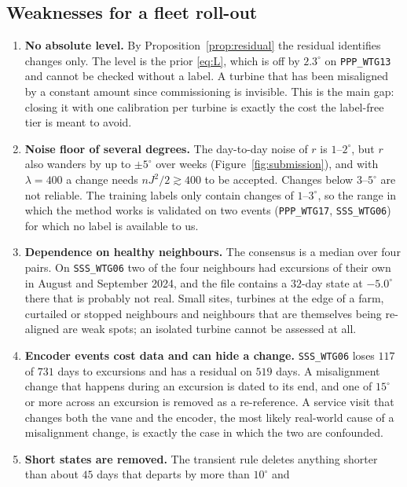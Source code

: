 \documentclass[11pt,a4paper]{article}
\theoremstyle{remark}
\newcommand{\dg}{^{\circ}}
\newcommand{\code}[1]{\texttt{#1}}
\begin{document}
\subsection{Weaknesses for a fleet roll-out}
\begin{enumerate}
\item \textbf{No absolute level.} By Proposition~\ref{prop:residual} the
      residual identifies changes only. The level is the prior \eqref{eq:L},
      which is off by $2.3\dg$ on \code{PPP\_WTG13} and cannot be checked
      without a label. A turbine that has been misaligned by a constant amount
      since commissioning is invisible. This is the main gap: closing it with
      one calibration per turbine is exactly the cost the label-free tier is
      meant to avoid.
\item \textbf{Noise floor of several degrees.} The day-to-day noise of $r$ is
      $1$--$2\dg$, but $r$ also wanders by up to $\pm5\dg$ over weeks
      (Figure~\ref{fig:submission}), and with $\lambda=400$ a change needs
      $nJ^2/2\gtrsim400$ to be accepted. Changes below $3$--$5\dg$ are not
      reliable. The training labels only contain changes of $1$--$3\dg$, so
      the range in which the method works is validated on two events
      (\code{PPP\_WTG17}, \code{SSS\_WTG06}) for which no label is available
      to us.
\item \textbf{Dependence on healthy neighbours.} The consensus is a median
      over four pairs. On \code{SSS\_WTG06} two of the four neighbours had
      excursions of their own in August and September 2024, and the file
      contains a $32$-day state at $-5.0\dg$ there that is probably not real.
      Small sites, turbines at the edge of a farm, curtailed or stopped
      neighbours and neighbours that are themselves being re-aligned are weak
      spots; an isolated turbine cannot be assessed at all.
\item \textbf{Encoder events cost data and can hide a change.}
      \code{SSS\_WTG06} loses $117$ of $731$ days to excursions and has a
      residual on $519$ days. A misalignment change that happens during an
      excursion is dated to its end, and one of $15\dg$ or more across an
      excursion is removed as a re-reference. A service visit that changes
      both the vane and the encoder, the most likely real-world cause of a
      misalignment change, is exactly the case in which the two are
      confounded.
\item \textbf{Short states are removed.} The transient rule deletes anything
      shorter than about $45$ days that departs by more than $10\dg$ and

\end{enumerate}
\end{document}
